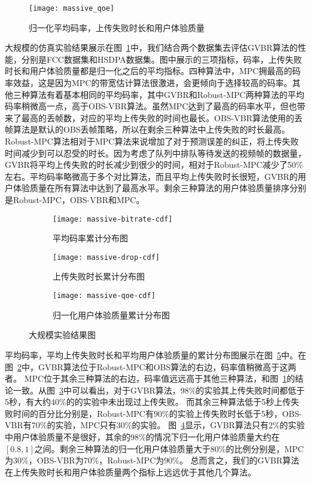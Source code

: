 \begin{figure}[tb]%
  \centering
  \texttt{[image: massive\_qoe]}
  \caption{归一化平均码率，上传失败时长和用户体验质量}
  \label{fig:massive_qoe}
\end{figure}

大规模的仿真实验结果展示在图~\ref{fig:massive_qoe}中，我们结合两个数据集去评估GVBR算法的性能，分别是FCC数据集和HSDPA数据集。图中展示的三项指标，码率，上传失败时长和用户体验质量都是归一化之后的平均指标。四种算法中，MPC拥最高的码率效益，这是因为MPC的带宽估计算法很激进，会更倾向于选择较高的码率。其他三种算法有着基本相同的平均码率，其中GVBR和Robust-MPC两种算法的平均码率稍微高一点，高于OBS-VBR算法。虽然MPC达到了最高的码率水平，但也带来了最高的丢帧数，对应的平均上传失败的时间也最长。OBS-VBR算法使用的丢帧算法是默认的OBS丢帧策略，所以在剩余三种算法中上传失败的时长最高。Robust-MPC算法相对于MPC算法来说增加了对于预测误差的纠正，将上传失败时间减少到可以忍受的时长。因为考虑了队列中排队等待发送的视频帧的数据量，GVBR将平均上传失败的时长减少到很少的时间，相对于Robust-MPC减少了50\%左右。平均码率略微高于多个对比算法，而且平均上传失败时长很短，GVBR的用户体验质量在所有算法中达到了最高水平。剩余三种算法的用户体验质量排序分别是Robust-MPC，OBS-VBR和MPC。

\begin{figure}[tb]
  \centering%
  \begin{subfigure}{0.48\textwidth}
    \texttt{[image: massive-bitrate-cdf]}
    \caption{平均码率累计分布图}
    \label{fig:bitrate_cdf}
  \end{subfigure}%
  \hfill
  \begin{subfigure}{0.48\textwidth}
    \texttt{[image: massive-drop-cdf]}
    \caption{上传失败时长累计分布图}
    \label{fig:drop_cdf}
  \end{subfigure}
  \vfill
  \vspace{0.2in}
  \begin{subfigure}{0.48\textwidth}
    \texttt{[image: massive-qoe-cdf]}
    \caption{归一化用户体验质量累计分布图}
    \label{fig:qoe_cdf}
  \end{subfigure}
  \caption{大规模实验结果图}
  \label{fig:massive_cdf}
\end{figure}

平均码率，平均上传失败时长和平均用户体验质量的累计分布图展示在图~\ref{fig:massive_cdf}中。在图~\ref{fig:bitrate_cdf}中，GVBR算法位于Robust-MPC和OBS算法的右边，码率值稍微高于这两者。
MPC位于其余三种算法的右边，码率值远远高于其他三种算法，和图~\ref{fig:massive_qoe}的结论一致。从图~\ref{fig:drop_cdf}中可以看出，对于GVBR算法，98\%的实验其上传失败时间都低于5秒，有大约40\%的的实验中未出现过上传失败。
而其余三种算法低于5秒上传失败时间的百分比分别是，Robust-MPC有90\%的实验上传失败时长低于5秒，OBS-VBR有70\%的实验，MPC只有30\%的实验。
图~\ref{fig:qoe_cdf}显示，GVBR算法只有2\%的实验中用户体验质量不是很好，其余的98\%的情况下归一化用户体验质量大约在$[0.8,1]$之间。剩余三种算法的归一化用户体验质量大于80\%的比例分别是，MPC为30\%，OBS-VBR为70\%，Robust-MPC为90\%。
总而言之，我们的GVBR算法在上传失败时长和用户体验质量两个指标上远远优于其他几个算法。

